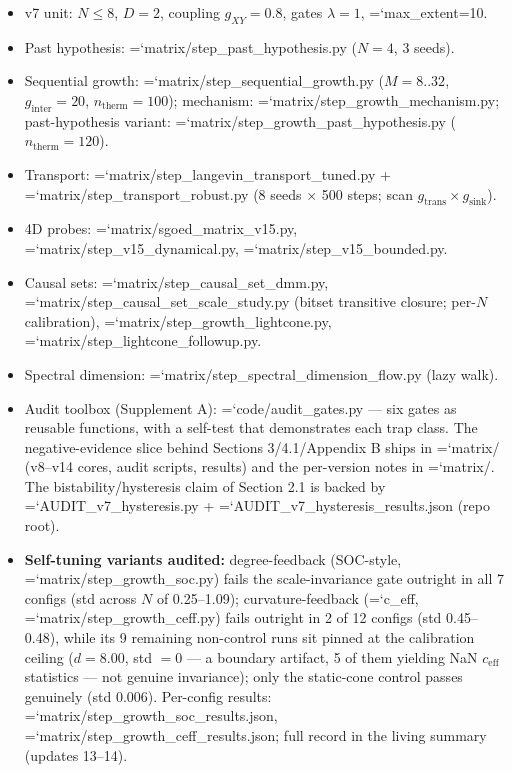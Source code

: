 \documentclass[12pt,a4paper]{article}
\providecommand{\tightlist}{%
  \setlength{\itemsep}{0pt}\setlength{\parskip}{0pt}}
\renewcommand{\texttt}[1]{{\ttfamily\hyphenchar\font=`\-\relax #1}}
\begin{document}
\begin{itemize}
\tightlist
\item
  v7 unit: \(N\le8\), \(D=2\), coupling \(g_{XY}=0.8\), gates
  \(\lambda=1\), \texttt{max\_extent=10}.
\item
  Past hypothesis: \texttt{matrix/step\_past\_hypothesis.py} (\(N=4\), 3
  seeds).
\item
  Sequential growth: \texttt{matrix/step\_sequential\_growth.py}
  (\(M=8..32\), \(g_{\mathrm{inter}}=20\), \(n_{\mathrm{therm}}=100\));
  mechanism: \texttt{matrix/step\_growth\_mechanism.py}; past-hypothesis
  variant: \texttt{matrix/step\_growth\_past\_hypothesis.py}
  (\(n_{\mathrm{therm}}=120\)).
\item
  Transport: \texttt{matrix/step\_langevin\_transport\_tuned.py} +
  \texttt{matrix/step\_transport\_robust.py} (8 seeds \(\times\) 500
  steps; scan \(g_{\mathrm{trans}}\times g_{\mathrm{sink}}\)).
\item
  4D probes: \texttt{matrix/sgoed\_matrix\_v15.py},
  \texttt{matrix/step\_v15\_dynamical.py},
  \texttt{matrix/step\_v15\_bounded.py}.
\item
  Causal sets: \texttt{matrix/step\_causal\_set\_dmm.py},
  \texttt{matrix/step\_causal\_set\_scale\_study.py} (bitset transitive
  closure; per-\(N\) calibration),
  \texttt{matrix/step\_growth\_lightcone.py},
  \texttt{matrix/step\_lightcone\_followup.py}.
\item
  Spectral dimension: \texttt{matrix/step\_spectral\_dimension\_flow.py}
  (lazy walk).
\item
  Audit toolbox (Supplement A): \texttt{code/audit\_gates.py} --- six
  gates as reusable functions, with a self-test that demonstrates each
  trap class. The negative-evidence slice behind Sections 3/4.1/Appendix
  B ships in \texttt{matrix/} (v8--v14 cores, audit scripts, results)
  and the per-version notes in \texttt{matrix/}. The
  bistability/hysteresis claim of Section 2.1 is backed by
  \texttt{AUDIT\_v7\_hysteresis.py} +
  \texttt{AUDIT\_v7\_hysteresis\_results.json} (repo root).
\item
  \textbf{Self-tuning variants audited:} degree-feedback (SOC-style,
  \texttt{matrix/step\_growth\_soc.py}) fails the scale-invariance gate
  outright in all 7 configs (std across \(N\) of 0.25--1.09);
  curvature-feedback (\texttt{c\_eff},
  \texttt{matrix/step\_growth\_ceff.py}) fails outright in 2 of 12
  configs (std 0.45--0.48), while its 9 remaining non-control runs sit
  pinned at the calibration ceiling (\(d=8.00\), std \(=0\) --- a
  boundary artifact, 5 of them yielding NaN \(c_{\mathrm{eff}}\)
  statistics --- not genuine invariance); only the static-cone control
  passes genuinely (std 0.006). Per-config results:
  \texttt{matrix/step\_growth\_soc\_results.json},
  \texttt{matrix/step\_growth\_ceff\_results.json}; full record in the
  living summary (updates 13--14).
\end{itemize}
\end{document}
